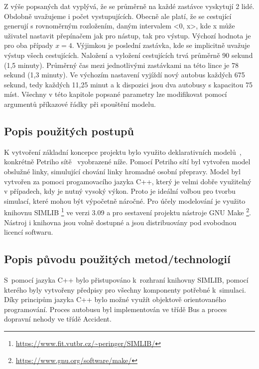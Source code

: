 \documentclass[a4paper]{article}
\begin{document}
 		Z výše popsaných dat vyplývá, že se průměrně na každé zastávce vyskytují 2 lidé. Obdobně uvažujeme i počet vystupujících. Obecně ale platí, že se cestující generují s rovnoměrným rozložením, daným intervalem <0, x>, kde x může uživatel nastavit přepínačem jak pro nástup, tak pro výstup. Výchozí hodnota je pro oba případy $x = 4$. Výjimkou je poslední zastávka, kde se implicitně uvažuje výstup všech cestujících.
 		Naložení a vyložení cestujících trvá průměrně 90 sekund (1,5 minuty). Průměrný čas mezi jednotlivými zastávkami na této lince je 78 sekund (1,3 minuty). 
 		Ve výchozím nastavení vyjíždí nový autobus každých 675 sekund, tedy každých 11,25 minut a k dispozici jsou dva autobusy s kapacitou 75 míst.  Všechny v této kapitole popsané parametry lze modifikovat pomocí argumentů příkazové řádky při spouštění modelu.
     
        \subsection{Popis použitých postupů}
        \label{subsec:methods}

            K vytvoření základní koncepce projektu bylo využito deklarativních modelů~\cite[snímek 49]{IMS_slides}, konkrétně Petriho sítě~\cite[snímek 123]{IMS_slides} vyobrazené níže.
            Pomocí Petriho sítí byl vytvořen model obslužné linky, simulující chování linky hromadné osobní přepravy. Model byl vytvořen za pomoci progamovacího jazyka C++, který je velmi dobře využitelný v případech, kdy je nutný vysoký výkon. Proto je ideální volbou pro tvorbu simulací, které mohou být výpočetně náročné. Pro účely modelování je využito knihovnu SIMLIB \footnote{\url{https://www.fit.vutbr.cz/~peringer/SIMLIB/}} ve verzi 3.09 a pro sestavení projektu nástroje GNU Make \footnote{\url{https://www.gnu.org/software/make/}}. Nástroj i knihovna jsou volně dostupné a jsou distribuovány pod svobodnou licencí softwaru.
            
        \subsection{Popis původu použitých metod/technologií}
        \label{subsec:techology}

			S~pomocí jazyka C++ bylo přistupováno k~rozhraní knihovny SIMLIB, pomocí kterého byly vytvořeny předpisy pro všechny komponenty potřebné k~simulaci. Díky principům jazyka C++ bylo možné využít objektově orientovaného programování. Proces autobusu byl implementován ve třídě Bus a proces dopravní nehody ve třídě Accident.
\end{document}
